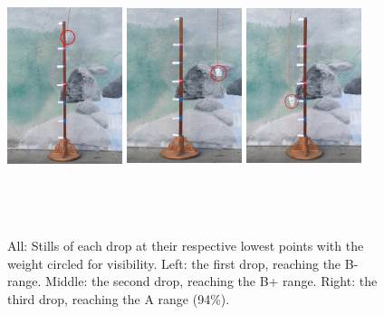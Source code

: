 \documentclass[12pt]{article}
\begin{document}
\begin{figure}[h]
    \centering
    \includegraphics[width=0.3\textwidth,height=7.9cm]{firstDrop}
    \includegraphics[width=0.3\textwidth,height=7.9cm]{secondDrop}
    \includegraphics[width=0.3\textwidth,height=7.9cm]{thirdDrop}
    \caption{All: Stills of each drop at their respective lowest points with the weight circled for visibility. Left: the first drop, reaching the B- range. Middle: the second drop, reaching the B+ range. Right: the third drop, reaching the A range (94\%).}
    \label{fig:dropStills}
\end{figure}
\end{document}
